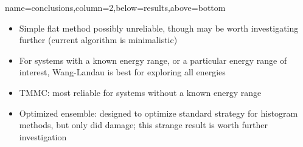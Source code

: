 \documentclass[paperwidth=48in,paperheight=36in,
fontscale=0.27,margin=0.75in]{baposter}
\begin{document}
\begin{poster}
{  }

  {name=conclusions,column=2,below=results,above=bottom}{%

    \begin{itemize}
    \item Simple flat method possibly unreliable, though may be worth
      investigating further (current algorithm is minimalistic)
    \item For systems with a known energy range, or a particular
      energy range of interest, Wang-Landau is best for exploring all
      energies
    \item TMMC: most reliable for systems without a known energy range
    \item Optimized ensemble: designed to optimize standard strategy
      for histogram methods, but only did damage; this strange result
      is worth further investigation
    \end{itemize}

  }

\end{poster}
\end{document}

